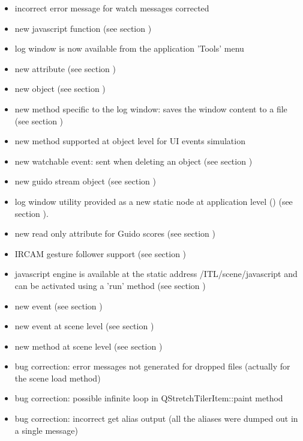 \begin{itemize}
\item incorrect error message for watch messages corrected
\item new javascript  function (see section )
\item log window is now available from the application 'Tools' menu
\item new  attribute (see section )
\item new  object (see section )
\item new  method specific to the log window: saves the window content to a file (see section )
\item new  method supported at object level for UI events simulation
\item new  watchable event: sent when deleting an object (see section )
\item new  guido stream object (see section )
\end{itemize}

\begin{itemize}
\item log window utility provided as a new static node at application level () (see section ).
\item new  read only attribute for Guido scores (see section )
\item IRCAM gesture follower support (see section )
\item javascript engine is available at the static address /ITL/scene/javascript and can be activated using a 'run' method  (see section )
\item new  event (see section )
\item new  event at scene level  (see section )
\item new  method at scene level (see section )
\item bug correction: error messages not generated for dropped files (actually for the scene load method)
\item bug correction: possible infinite loop in QStretchTilerItem::paint method
\item bug correction: incorrect get alias output (all the aliases were dumped out in a single message)
\end{itemize}

